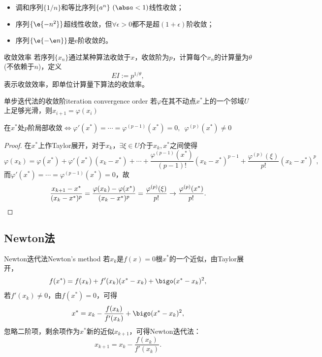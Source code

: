 \begin{example}
    {}{}
    \begin{itemize}
        \item 调和序列$\{1/n\}$和等比序列$\{a^n\}~(\abs a<1)$线性收敛；
        \item 序列$\{\e{-n^2}\}$超线性收敛，但$\forall\epsilon>0$都不是超$(1+\epsilon)$阶收敛；
        \item 序列$\{\e{-\e n}\}$是e阶收敛的。
    \end{itemize}
\end{example}

\begin{definition}
    {收敛效率}{}
    若序列$\{x_n\}$通过某种算法收敛于$x$，收敛阶为$p$，计算每个$x_n$的计算量为$\theta$ (不依赖于$n$)，定义
    \[
        EI:=p^{1/\theta},
    \]
    表示收敛效率，即单位计算量下算法的收敛率。
\end{definition}

\begin{theorem}
    {单步迭代法的收敛阶}{iteration convergence order}
    若$\varphi$在其不动点$x^*$上的一个邻域$U$上足够光滑，则$x_{i+1}=\varphi(x_i)$
    \begin{center}
        在$x^*$处$p$阶局部收敛$\iff\varphi'(x^*)=\cdots=\varphi^{(p-1)}(x^*)=0,\enspace\varphi^{(p)}(x^*)\neq 0$
    \end{center}
\end{theorem}

\begin{proof}
    在$x^*$上作Taylor展开，对于$x_k$，$\exists\xi\in U$介于$x_k,x^*$之间使得
    \[
        \varphi(x_k)=\varphi(x^*)+\varphi'(x^*)(x_k-x^*)+\cdots+\frac{\varphi^{(p-1)}(x^*)}{(p-1)!}(x_k-x^*)^{p-1}+\frac{\varphi^{(p)}(\xi)}{p!}(x_k-x^*)^p,
    \]
    而$\varphi'(x^*)=\cdots=\varphi^{(p-1)}(x^*)=0$，故
    \[
        \frac{x_{k+1}-x^*}{(x_k-x^*)^p}=\frac{\varphi(x_k)-\varphi(x^*)}{(x_k-x^*)^p}
        =\frac{\varphi^{(p)}(\xi)}{p!}\to\frac{\varphi^{(p)}(x^*)}{p!}.
        \qedhere
    \]
\end{proof}

\subsection{Newton法}

\begin{theorem}
    {Newton迭代法}{Newton's method}
    若$x_k$是$f(x)=0$根$x^*$的一个近似，由Taylor展开，
    \[
        f(x^*)=f(x_k)+f'(x_k)(x^*-x_k)+\bigo(x^*-x_k)^2,
    \]
    若$f'(x_k)\neq 0$，由$f(x^*)=0$，可得 
    \[
        x^*=x_k-\frac{f(x_k)}{f'(x_k)}+\bigo(x^*-x_k)^2,
    \]
    忽略二阶项，剩余项作为$x^*$新的近似$x_{k+1}$，可得Newton迭代法：
    \begin{equation}
        \label{eqn:Newton iter}
        x_{k+1}=x_k-\frac{f(x_k)}{f'(x_k)}.
    \end{equation}
\end{theorem}

